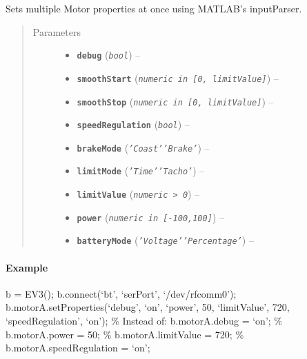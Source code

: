 \documentclass[letterpaper,10pt,english]{sphinxmanual}
\begin{document}
\begin{fulllineitems}

\begin{fulllineitems}
\label{source:source.Motor.setProperties}
Sets multiple Motor properties at once using MATLAB's inputParser.
\begin{quote}\begin{description}
\item[{Parameters}] \leavevmode\begin{itemize}
\item {} 
\textbf{\texttt{debug}} (\emph{\texttt{bool}}) -- 

\item {} 
\textbf{\texttt{smoothStart}} (\emph{\texttt{numeric in {[}0, limitValue{]}}}) -- 

\item {} 
\textbf{\texttt{smoothStop}} (\emph{\texttt{numeric in {[}0, limitValue{]}}}) -- 

\item {} 
\textbf{\texttt{speedRegulation}} (\emph{\texttt{bool}}) -- 

\item {} 
\textbf{\texttt{brakeMode}} (\emph{\texttt{'Coast'\textbar{}'Brake'}}) -- 

\item {} 
\textbf{\texttt{limitMode}} (\emph{\texttt{'Time'\textbar{}'Tacho'}}) -- 

\item {} 
\textbf{\texttt{limitValue}} (\emph{\texttt{numeric \textgreater{} 0}}) -- 

\item {} 
\textbf{\texttt{power}} (\emph{\texttt{numeric in {[}-100,100{]}}}) -- 

\item {} 
\textbf{\texttt{batteryMode}} (\emph{\texttt{'Voltage'\textbar{}'Percentage'}}) -- 

\end{itemize}

\end{description}\end{quote}
\paragraph{Example}

b = EV3(); 
b.connect(`bt', `serPort', `/dev/rfcomm0'); 
b.motorA.setProperties(`debug', `on', `power', 50, `limitValue', 720, `speedRegulation', `on'); 
\% Instead of: b.motorA.debug = `on'; 
\%             b.motorA.power = 50; 
\%             b.motorA.limitValue = 720; 
\%             b.motorA.speedRegulation = `on'; 


\end{fulllineitems}
\end{fulllineitems}
\end{document}
